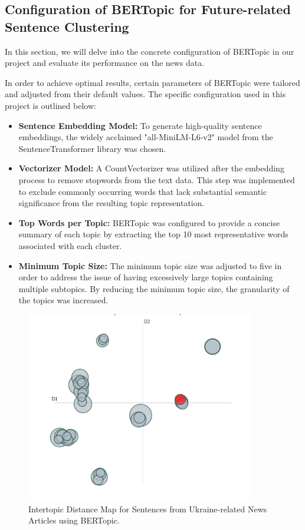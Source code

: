 \documentclass[a4paper,12pt]{report} %
\begin{document}
\subsection{Configuration of BERTopic for Future-related Sentence Clustering}
In this section, we will delve into the concrete configuration of BERTopic in our project and evaluate its performance on the news data.

In order to achieve optimal results, certain parameters of BERTopic were tailored and adjusted from their default values. The specific configuration used in this project is outlined below:

\begin{itemize}
    \item \textbf{Sentence Embedding Model:} To generate high-quality sentence embeddings, the widely acclaimed "all-MiniLM-L6-v2" model from the SentenceTransformer library was chosen.

    \item \textbf{Vectorizer Model:} A CountVectorizer was utilized after the embedding process to remove stopwords from the text data. This step was implemented to exclude commonly occurring words that lack substantial semantic significance from the resulting topic representation.

    \item \textbf{Top Words per Topic:} BERTopic was configured to provide a concise summary of each topic by extracting the top 10 most representative words associated with each cluster.

    \item \textbf{Minimum Topic Size:} The minimum topic size was adjusted to five in order to address the issue of having excessively large topics containing multiple subtopics. By reducing the minimum topic size, the granularity of the topics was increased.
\end{itemize}

\begin{figure}
  \centering
  \includegraphics[width=10cm]{img/intertopic_distance_map.png}
  \caption{Intertopic Distance Map for Sentences from Ukraine-related News Articles using BERTopic.}
  \label{fig:intertopic_distance_map}
\end{figure}
\end{document}
